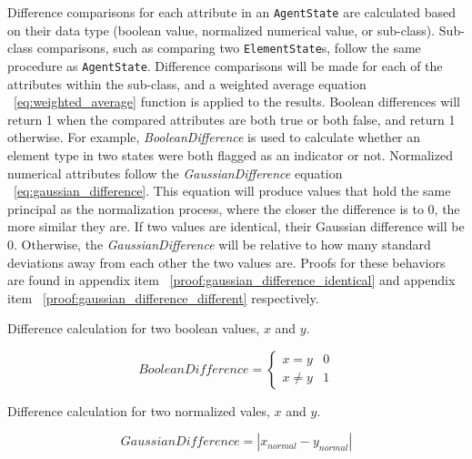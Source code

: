 Difference comparisons for each attribute in an \texttt{AgentState} are calculated based on their data type (boolean value, normalized numerical value, or sub-class).
Sub-class comparisons, such as comparing two \texttt{ElementState}s, follow the same procedure as \texttt{AgentState}.
Difference comparisons will be made for each of the attributes within the sub-class, and a weighted average equation ~\ref{eq:weighted_average} function is applied to the results.
Boolean differences will return 1 when the compared attributes are both true or both false, and return 1 otherwise.
For example, \textit{BooleanDifference} is used to calculate whether an element type in two states were both flagged as an indicator or not.
Normalized numerical attributes follow the \textit{GaussianDifference} equation ~\ref{eq:gaussian_difference}.
This equation will produce values that hold the same principal as the normalization process, where the closer the difference is to 0, the more similar they are.
If two values are identical, their Gaussian difference will be 0.
Otherwise, the \textit{GaussianDifference} will be relative to how many standard deviations away from each other the two values are.
Proofs for these behaviors are found in appendix item ~\ref{proof:gaussian_difference_identical} and appendix item ~\ref{proof:gaussian_difference_different} respectively.

\caption{Difference calculation for two boolean values, $x$ and $y$.}
\begin{equation}
  BooleanDifference = \begin{cases}
  x = y & 0 \\
  x \neq y & 1
\end{cases}
\end{equation}

\caption{Difference calculation for two normalized vales, $x$ and $y$.}
\begin{equation} \label{eq:gaussian_difference}
  GaussianDifference = |x_{normal} - y_{normal}|
\end{equation}


